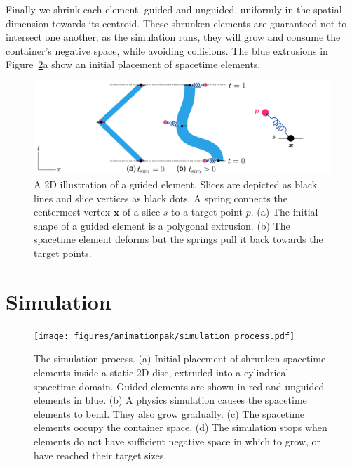 Finally we shrink each element, guided and unguided, uniformly in the spatial dimension
towards its centroid.  These shrunken elements are
guaranteed not to intersect one another; as the simulation runs, they
will grow and consume the container's negative space, while avoiding
collisions.
The blue extrusions in Figure~\ref{fig_animationpak_simulation_process}a show an
initial placement of spacetime elements.

\begin{figure}
\centering
\includegraphics[width=1.0\textwidth]{figures/animationpak/guided_element.pdf} 
\caption[A 2D illustration of a guided element]{
\label{fig_animationpak_guided_element} A 2D illustration of a guided element.
Slices are depicted as black lines and slice vertices as black dots.
A spring connects the centermost vertex $\bm{x}$ of a slice $s$ to a target
point $p$.
(a) The initial shape of a guided element is a polygonal extrusion.
(b) The spacetime element deforms but the springs pull it back towards
the target points.}
\end{figure}




\section{Simulation}
\label{animationpak_simulation}


\begin{figure}[h]
\centering
\texttt{[image: figures/animationpak/simulation\_process.pdf]} 
\caption[AnimationPak simulation process]{
\label{fig_animationpak_simulation_process} The simulation process. 
(a) Initial placement of 
shrunken spacetime elements inside a static 2D disc, extruded into a 
cylindrical spacetime domain.
Guided elements are shown in red and unguided elements in blue.
(b) A physics simulation causes the spacetime elements to bend. They
also grow gradually.
(c) The spacetime elements occupy the container space.
(d) The simulation stops when elements do not have sufficient negative
space in which to grow, or have reached their target sizes.
}
\end{figure}

